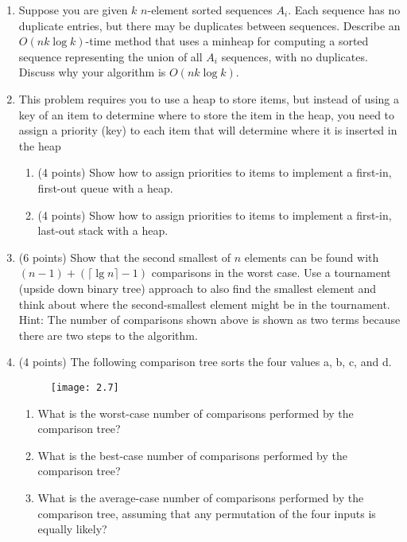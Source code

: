 \documentclass[12pt]{report}
\begin{document}
\begin{enumerate}[label=\arabic*.]
	\item Suppose you are given $k$ $n$-element sorted sequences $A_{i}$. Each sequence has no duplicate entries, but there may be duplicates between sequences. Describe an $O(nk \log k)$-time method that uses a minheap for computing a sorted sequence representing the union of all $A_{i}$ sequences, with no duplicates. Discuss why your algorithm is $O(nk \log k)$.
	\item This problem requires you to use a heap to store items, but instead of using a key of an item to determine where to store the item in the heap, you need to assign a priority (key) to each item that will determine where it is inserted in the heap
	\begin{enumerate}[label=\arabic{enumi}\alph*)]
	    \item (4 points) Show how to assign priorities to items to implement a first-in, first-out queue with a heap.
		\item (4 points) Show how to assign priorities to items to implement a first-in, last-out stack with a heap.
	\end{enumerate}
	\item (6 points) Show that the second smallest of $n$ elements can be found with $(n-1) + (\lceil \lg n \rceil-1)$ comparisons in the worst case. Use a tournament (upside down binary tree) approach to also find the smallest element and think about where the second-smallest element might be in the tournament. Hint: The number of comparisons shown above is shown as two terms because there are two steps to the algorithm.
	\item (4 points) The following comparison tree sorts the four values a, b, c, and d.
	\begin{figure}[H]
		\centering
		\texttt{[image: 2.7]}
		\caption{}
		\label{fig:2.7}
	\end{figure}
	\begin{enumerate}[label=\arabic{enumi}\alph*)]
		\item What is the worst-case number of comparisons performed by the comparison tree?
		\item What is the best-case number of comparisons performed by the comparison tree?
		\item What is the average-case number of comparisons performed by the comparison tree, assuming that any permutation of the four inputs is equally likely?
	\end{enumerate}
\end{enumerate}

\end{document}
